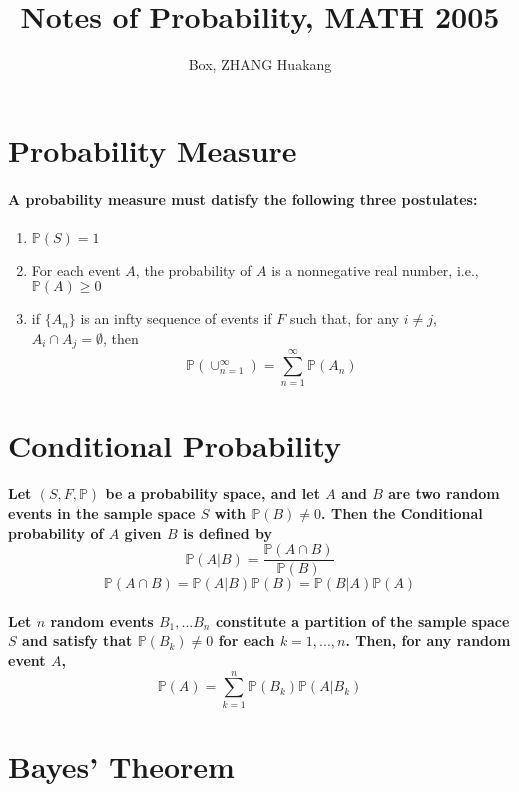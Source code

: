 \documentclass[titlepage]{article}
\title{Notes of Probability, MATH 2005}
\author{Box, ZHANG Huakang}
\begin{document}
    \maketitle
    \tableofcontents
    \section{Probability Measure}
        \paragraph{
            A probability measure must datisfy the following three postulates:
        }
        \begin{enumerate}
            \item $\mathbb{P}(S)=1$
            \item For each event $A$, the probability of $A$ is a nonnegative real number, i.e., $\mathbb{P}(A)\geq 0$
            \item if $\{A_n\}$ is an infty sequence of events if $F$ such that, for any $i\neq j$, $A_i\cap A_j=\emptyset$, then $$\mathbb{P}(\cup_{n=1}^\infty)=\sum_{n=1}^\infty\mathbb{P}(A_n)$$
        \end{enumerate}
    \section{Conditional Probability}
        \paragraph{
            Let $(S,F,\mathbb{P})$ be a probability space, and let $A$ and $B$ are two random events in the sample space $S$ with $\mathbb{P}(B)\neq 0$. Then the Conditional probability of $A$ given $B$ is defined by 
            $$\mathbb{P}(A|B)=\frac{\mathbb{P}(A\cap B)}{\mathbb{P}(B)}$$
            $$\mathbb{P}(A\cap B)=\mathbb{P}(A|B)\mathbb{P}(B)=\mathbb{P}(B|A)\mathbb{P}(A)$$
        }
        \paragraph{
            Let $n$ random events $B_1,...B_n$ constitute a partition of the sample space $S$ and satisfy that $\mathbb{P}(B_k)\neq 0$ for each $k=1,...,n$. Then, for any random event $A$,
            $$\mathbb{P}(A)=\sum_{k=1}^n\mathbb{P}(B_k)\mathbb{P}(A|B_k)$$
        }
    \section{Bayes' Theorem}
\end{document}
